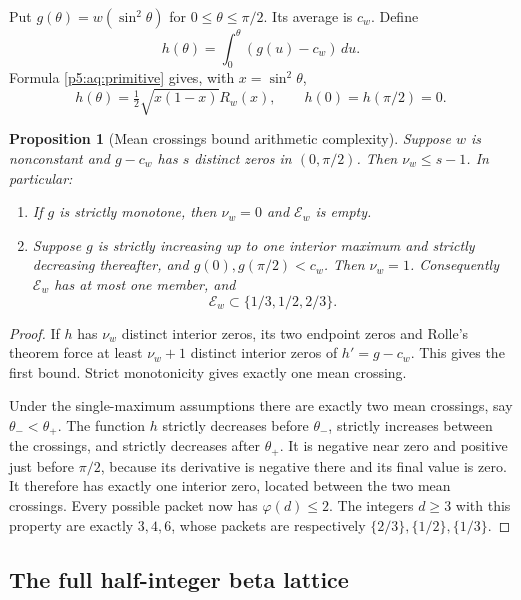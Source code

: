 \documentclass[11pt,a4paper]{article}
\newtheorem{proposition}[theorem]{Proposition}
\theoremstyle{definition}
\theoremstyle{remark}
\numberwithin{equation}{section}
\begin{document}
Put $g(\theta)=w(\sin^2\theta)$ for $0\le\theta\le\pi/2$.
Its average is $c_w$. Define
\[
 h(\theta)=\int_0^\theta(g(u)-c_w)\,du.
\]
Formula \eqref{p5:aq:primitive} gives, with $x=\sin^2\theta$,
\begin{equation}\label{p5:aq:h-relation}
 h(\theta)=\tfrac12\sqrt{x(1-x)}R_w(x),\qquad
 h(0)=h(\pi/2)=0.
\end{equation}

\begin{proposition}[Mean crossings bound arithmetic complexity]
\label{p5:aq:shape}
Suppose $w$ is nonconstant and $g-c_w$ has $s$ distinct
zeros in $(0,\pi/2)$. Then $\nu_w\le s-1$.
In particular:
\begin{enumerate}
\item If $g$ is strictly monotone, then $\nu_w=0$ and
      $\mathcal E_w$ is empty.
\item Suppose $g$ is strictly increasing up to one interior
      maximum and strictly decreasing thereafter, and
      $g(0),g(\pi/2)<c_w$. Then $\nu_w=1$.
      Consequently $\mathcal E_w$ has at most one member,
      and
      \[
       \mathcal E_w\subset\{1/3,1/2,2/3\}.
      \]
\end{enumerate}
\end{proposition}

\begin{proof}
If $h$ has $\nu_w$ distinct interior zeros, its two endpoint
zeros and Rolle's theorem force at least $\nu_w+1$ distinct
interior zeros of $h'=g-c_w$. This gives the first bound.
Strict monotonicity gives exactly one mean crossing.

Under the single-maximum assumptions there are exactly two
mean crossings, say $\theta_-<\theta_+$. The function $h$
strictly decreases before $\theta_-$, strictly increases
between the crossings, and strictly decreases after
$\theta_+$. It is negative near zero and positive just before
$\pi/2$, because its derivative is negative there and its
final value is zero. It therefore has exactly one interior zero,
located between the two mean crossings.
Every possible packet now has $\varphi(d)\le2$.
The integers $d\ge3$ with this property are exactly
$3,4,6$, whose packets are respectively $\{2/3\},\{1/2\},\{1/3\}$.
\end{proof}

\subsection{The full half-integer beta lattice}
\end{document}
